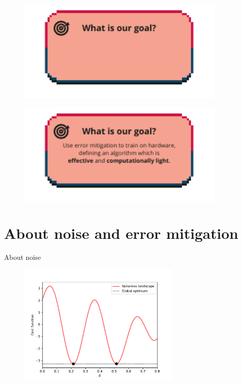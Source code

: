\documentclass[8pt, xcolor={svgnames}, hyperref={linkcolor=black}, aspectratio=169]{beamer}
\begin{document}
\begin{frame}
\vspace{1cm}
\begin{figure}
\includegraphics[width=0.9\textwidth]{figures/empty_banner.pdf}
\end{figure}
\end{frame}

\begin{frame}
\vspace{1cm}
\begin{figure}
\includegraphics[width=0.9\textwidth]{figures/banner.pdf}
\end{figure}
\end{frame}

\section{About noise and error mitigation}

\begin{frame}{About noise}
\begin{figure}
\includegraphics[width=0.7\textwidth]{figures/norm.pdf}
\end{figure}
\end{frame}
\end{document}
